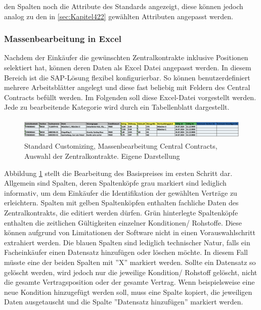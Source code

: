 den Spalten noch die Attribute des Standards angezeigt, diese können jedoch analog zu den in \ref{sec:Kapitel422} gewählten Attributen angepasst werden.

\subsubsection{Massenbearbeitung in Excel}

Nachdem der Einkäufer die gewünschten Zentralkontrakte inklusive Positionen selektiert hat, können deren Daten als Excel Datei angepasst werden. In diesem Bereich ist die SAP-Lösung flexibel konfigurierbar. So können benutzerdefiniert mehrere Arbeitsblätter angelegt und diese fast beliebig mit Feldern des Central Contracts befüllt werden. Im Folgenden soll diese Excel-Datei vorgestellt werden. Jede zu bearbeitende Kategorie wird durch ein Tabellenblatt dargestellt.

\begin{figure}[H]
    \centering
    \includegraphics[height=1.03cm]{Bilder/Praxisteil-S-Schritt-2.png}
    \caption[Standard Customizing, Massenbearbeitung Central Contracts, Bearbeitung des Basispreises]{Standard Customizing, Massenbearbeitung Central Contracts, Auswahl der Zentralkontrakte. Eigene Darstellung}
    \label{fig:PraxisSSchritt2}
\end{figure}

Abbildung \ref{fig:PraxisSSchritt2} stellt die Bearbeitung des Basispreises im ersten Schritt dar. Allgemein sind Spalten, deren Spaltenköpfe grau markiert sind lediglich informativ, um dem Einkäufer die Identifikation der gewählten Verträge zu erleichtern. Spalten mit gelben Spaltenköpfen enthalten fachliche Daten des Zentralkontrakts, die editiert werden dürfen. Grün hinterlegte Spaltenköpfe enthalten die zeitlichen Gültigkeiten einzelner Konditionen/ Rohstoffe. Diese können aufgrund von Limitationen der Software nicht in einen Vorauswahlschritt extrahiert werden. Die blauen Spalten sind lediglich technischer Natur, falls ein Facheinkäufer einen Datensatz hinzufügen oder löschen möchte. In diesem Fall müsste eine der beiden Spalten mit ''X'' markiert werden. Sollte ein Datensatz so gelöscht werden, wird jedoch nur \zB die jeweilige Kondition/ Rohstoff gelöscht, nicht die gesamte Vertragsposition oder der gesamte Vertrag. Wenn beispielsweise eine neue Kondition hinzugefügt werden soll, muss eine Spalte kopiert, die jeweiligen Daten ausgetauscht und die Spalte ''Datensatz hinzufügen'' markiert werden.


